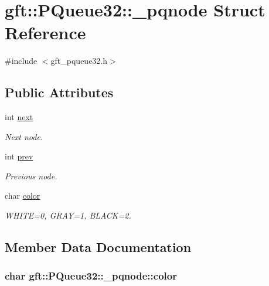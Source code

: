 \hypertarget{structgft_1_1PQueue32_1_1__pqnode}{\section{gft\-:\-:P\-Queue32\-:\-:\-\_\-pqnode Struct Reference}
\label{structgft_1_1PQueue32_1_1__pqnode}
}


{\ttfamily \#include $<$gft\-\_\-pqueue32.\-h$>$}

\subsection*{Public Attributes}
\begin{DoxyCompactItemize}
\item 
int \hyperlink{structgft_1_1PQueue32_1_1__pqnode_a044ff40f8cd925b0269ebada823fbc0c}{next}
\begin{DoxyCompactList}\small\item\em Next node. \end{DoxyCompactList}\item 
int \hyperlink{structgft_1_1PQueue32_1_1__pqnode_a2a10c5ab969878d64e00c1a272c55a42}{prev}
\begin{DoxyCompactList}\small\item\em Previous node. \end{DoxyCompactList}\item 
char \hyperlink{structgft_1_1PQueue32_1_1__pqnode_ab5d0e47679597dc75cd13a9dcff56dca}{color}
\begin{DoxyCompactList}\small\item\em W\-H\-I\-T\-E=0, G\-R\-A\-Y=1, B\-L\-A\-C\-K=2. \end{DoxyCompactList}\end{DoxyCompactItemize}


\subsection{Member Data Documentation}
\hypertarget{structgft_1_1PQueue32_1_1__pqnode_ab5d0e47679597dc75cd13a9dcff56dca}{
\subsubsection[{color}]{\setlength{\rightskip}{0pt plus 5cm}char gft\-::\-P\-Queue32\-::\-\_\-pqnode\-::color}}\label{structgft_1_1PQueue32_1_1__pqnode_ab5d0e47679597dc75cd13a9dcff56dca}


